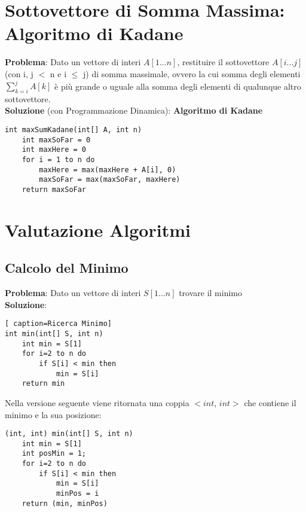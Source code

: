 \documentclass[../cheatSheetAlgoritmi.tex]{subfiles}
\begin{document}
\section{Sottovettore di Somma Massima: Algoritmo di Kadane}
\textbf{Problema}: Dato un vettore di interi $A[1...n]$, restituire il sottovettore $A[i...j]$ (con i, j $<$ n e i $\leq$ j) di somma massimale, ovvero la cui somma degli elementi $\sum_{k=i}^j A[k]$ è più grande o uguale alla somma degli elementi di qualunque altro sottovettore.\\
\textbf{Soluzione} (con Programmazione Dinamica): \textbf{Algoritmo di Kadane}
\begin{lstlisting}[caption=Kadane Algorithm]
int maxSumKadane(int[] A, int n)
	int maxSoFar = 0
	int maxHere = 0
	for i = 1 to n do
		maxHere = max(maxHere + A[i], 0)
		maxSoFar = max(maxSoFar, maxHere)
	return maxSoFar
\end{lstlisting}

\section{Valutazione Algoritmi} \subsection{Calcolo del Minimo}
\textbf{Problema}: Dato un vettore di interi $S[1...n]$ trovare il minimo\\
\textbf{Soluzione}:
\begin{lstlisting}[ caption=Ricerca Minimo]
int min(int[] S, int n)
	int min = S[1]
	for i=2 to n do
		if S[i] < min then
			min = S[i]
	return min
\end{lstlisting}
Nella versione seguente viene ritornata una coppia $<$$int$, $int$$>$ che contiene il minimo e la sua posizione:
\begin{lstlisting}[caption=Ricerca Minimo ritornando gli indici]
(int, int) min(int[] S, int n)
	int min = S[1]
	int posMin = 1;
	for i=2 to n do
		if S[i] < min then
			min = S[i]
			minPos = i
	return (min, minPos)
\end{lstlisting}
\newpage
\end{document}

